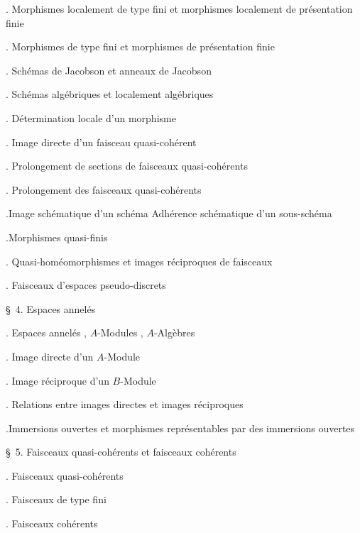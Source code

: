 \noindent{}. Morphismes localement de type fini et morphismes localement de présentation finie\dotfill

\noindent{}. Morphismes de type fini et morphismes de présentation finie\dotfill

\noindent{}. Schémas de Jacobson et anneaux de Jacobson\dotfill

\noindent{}. Schémas algébriques et localement algébriques\dotfill

\noindent{}. Détermination locale d'un morphisme\dotfill

\noindent{}. Image directe d'un faisceau quasi-cohérent\dotfill

\noindent{}. Prolongement de sections de faisceaux quasi-cohérents

\noindent{}. Prolongement des faisceaux quasi-cohérents\dotfill

\noindent{}.Image schématique d'un schéma Adhérence schématique d'un sous-schéma\dotfill

\noindent{}.Morphismes quasi-finis\dotfill


\noindent{}. Quasi-homéomorphismes et images réciproques de faisceaux\dotfill

\noindent{}. Faisceaux d'espaces pseudo-discrets\dotfill

\noindent\quad \S\ 4. Espaces annelés\dotfill

\noindent{}. Espaces annelés , $A$-Modules , $A$-Algèbres\dotfill

\noindent{}. Image directe d'un $A$-Module\dotfill

\noindent{}. Image réciproque d'un $B$-Module\dotfill

\noindent{}. Relations entre images directes et images réciproques\dotfill

\noindent{}.Immersions ouvertes et morphismes représentables par des immersions ouvertes \dotfill

\noindent\quad \S\ 5. Faisceaux quasi-cohérents et faisceaux cohérents\dotfill

\noindent{}. Faisceaux quasi-cohérents\dotfill

\noindent{}. Faisceaux de type fini\dotfill

\noindent{}. Faisceaux cohérents\dotfill

